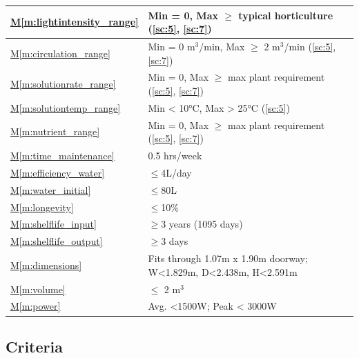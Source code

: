 \documentclass{report}
\newcommand{\mref}[1]{\hyperref[#1]{M\ref{#1}}}
\begin{document}
\begin{tabular}{|l|p{14.35cm}|}
    \hline
    \mref{m:lightintensity_range} & Min = 0, Max $\ge$ typical horticulture \hfill (\ref{sc:5}, \ref{sc:7}) \\
    \hline
    \mref{m:circulation_range} & Min = 0 m${}^3$/min, Max $\ge$ 2 m${}^3$/min \hfill (\ref{sc:5}, \ref{sc:7}) \\
    \hline
    \mref{m:solutionrate_range} & Min = 0, Max $\ge$ max plant requirement \hfill (\ref{sc:5}, \ref{sc:7}) \\
    \hline
    \mref{m:solutiontemp_range} & Min < 10°C, Max > 25°C \hfill (\ref{sc:5})\\
    \hline
    \mref{m:nutrient_range} & Min = 0, Max $\ge$ max plant requirement \hfill (\ref{sc:5}, \ref{sc:7}) \\
    \hline
    \mref{m:time_maintenance} & 0.5 hrs/week \hfill \cite{dsfc-phase2}\\
    \hline
    \mref{m:efficiency_water} & $\le$4L/day \hfill \cite{dsfc-phase2} \\
    \hline
    \mref{m:water_initial} & $\le$80L \hfill \cite{dsfc-phase2} \\
    \hline
    \mref{m:longevity} & $\le$10\% \hfill \cite{applicantguide,dsfc-phase2}\\
    \hline
    \mref{m:shelflife_input} & $\ge$3 years (1095 days) \hfill \cite{applicantguide,dsfc-phase2}\\
    \hline
    \mref{m:shelflife_output} & $\ge$3 days \hfill \cite{dsfc-phase2} \\
    \hline
    \mref{m:dimensions} & Fits through 1.07m x 1.90m doorway; W<1.829m, D<2.438m, H<2.591m \hfill \cite{applicantguide,dsfc-phase2} \\
    \hline
    \mref{m:volume} & $\le$ 2 m${}^3$ \hfill \cite{applicantguide,dsfc-phase2}\\
    \hline
    \mref{m:power} & Avg. <1500W; Peak < 3000W \hfill \cite{applicantguide,dsfc-phase2}\\
    \hline
\end{tabular}
\vfill
{}

\subsection{Criteria}
\label{sec:criteria}
\end{document}
